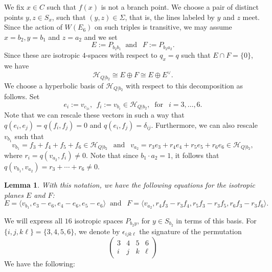 \documentclass[11pt]{amsart}
\newtheorem{lemma}[theorem]{Lemma}
\theoremstyle{definition}
\def\cH{\mathcal{H}}
\begin{document}
We fix $x\in C$ such that $f(x)$ is not a branch point. We choose a pair of distinct points $y,z\in S_x$, such that $(y,z)\in \Sigma$, that is, the lines labeled by $y$ and $z$ meet. Since the action of $W(E_6)$ on such triples is transitive, we may assume $x=b_2, y=b_1$ and $z=a_2$ and we set 
\begin{equation}\label{eq:E-F}
E:=P_{b_2 b_1} \ \mbox{ and } \ \ F:=P_{b_2 a_2}.
\end{equation}
Since these are isotropic $4$-spaces with respect to $q_x=q$ such that $E\cap F=\{0\}$, we have
\begin{equation}\label{eq:H-splitting}
    \cH_{Q|b_2}\cong E\oplus F\cong E\oplus E^{\vee}.
\end{equation}
We choose a hyperbolic basis of $\cH_{Q|b_2}$ with respect to this decomposition as follows. Set 
\begin{equation}\label{eq:e_i,f_i}
e_i:=v_{c_{1 i}}, \ \   f_i:=v_{b_i} \in \cH_{Q|b_2}, \  \mbox{ for } \ \ i=3, \ldots, 6.     
\end{equation}
Note that we can rescale these vectors in such a way that $q(e_i, e_j)=q(f_i, f_j)=0$ and $q(e_i, f_j)=\delta_{ij}$. Furthermore, we can also rescale $v_{b_1}$ such that
$$v_{b_1}=f_3+f_4+f_5+f_6\in \cH_{Q|b_2} \ \ \mbox{ and } \ \ v_{a_2}=r_3e_3+r_4e_4+r_5e_5+r_6e_6\in \cH_{Q|b_2},$$ where $r_i=q(v_{a_2}, f_i)\neq 0$. Note that since $b_1\cdot a_2=1$, it follows that $q(v_{b_1}, v_{a_2})=r_3+\cdots+r_6\neq 0$.

\begin{lemma}\label{lemma:E+F}
With this notation, we have the following equations for the isotropic planes $E$ and $F$:
$$E=\bigl\langle v_{b_1}, e_3-e_6, e_4-e_6, e_5-e_6\bigr\rangle \ \mbox{ and } \ \ F=\bigl\langle v_{a_2}, r_4f_3-r_3f_4, r_5f_3-r_3f_5, r_6f_3-r_3f_6 \bigr\rangle.
$$
\end{lemma}

We will express all $16$ isotropic spaces $P_{b_2 y}$, for $y\in S_{b_2}$ in terms of this basis. For $\{i,j,k\ell\}=\{3,4,5,6\}$, we denote by $\epsilon_{ijk\ell}$ the signature of the permutation 
$$
\begin{pmatrix}
3 & 4 & 5 & 6 \\
i & j & k & \ell
\end{pmatrix}
$$
We have the following:
\end{document}
